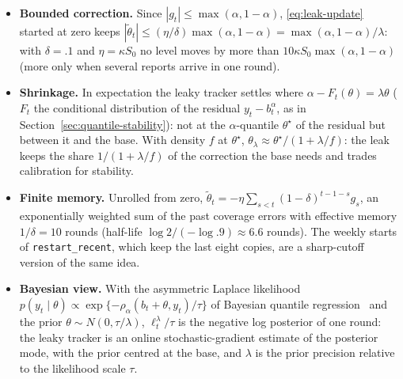 \documentclass[11pt,a4paper]{article}
\theoremstyle{definition}
\theoremstyle{remark}
\begin{document}
\begin{itemize}[leftmargin=*,itemsep=2pt]
\item \textbf{Bounded correction.} Since $|g_t|\le\max(\alpha,1-\alpha)$,
\eqref{eq:leak-update} started at zero keeps
$|\tilde\theta_t|\le(\eta/\delta)\max(\alpha,1-\alpha)
=\max(\alpha,1-\alpha)/\lambda$: with $\delta=.1$ and $\eta=\kappa S_0$ no
level moves by more than $10\kappa S_0\max(\alpha,1-\alpha)$ (more only
when several reports arrive in one round).
\item \textbf{Shrinkage.} In expectation the leaky tracker settles where
$\alpha-F_t(\theta)=\lambda\theta$ ($F_t$ the conditional distribution of
the residual $y_t-b_t^\alpha$, as in Section~\ref{sec:quantile-stability}):
not at the $\alpha$-quantile $\theta^\star$ of the residual but between it
and the base. With density $f$ at $\theta^\star$,
$\theta_\lambda\approx\theta^\star/(1+\lambda/f)$: the leak keeps the share
$1/(1+\lambda/f)$ of the correction the base needs and trades calibration
for stability.
\item \textbf{Finite memory.} Unrolled from zero,
$\tilde\theta_t=-\eta\sum_{s<t}(1-\delta)^{t-1-s}g_s$, an exponentially
weighted sum of the past coverage errors with effective memory
$1/\delta=10$ rounds (half-life $\log2/(-\log.9)\approx6.6$ rounds). The
weekly starts of \texttt{restart\_recent}, which keep the last eight
copies, are a sharp-cutoff version of the same idea.
\item \textbf{Bayesian view.} With the asymmetric Laplace likelihood
$p(y_t\mid\theta)\propto\exp\{-\rho_\alpha(b_t+\theta,y_t)/\tau\}$ of
Bayesian quantile regression~\cite{yu-moyeed} and the prior
$\theta\sim N(0,\tau/\lambda)$, $\ell_t^\lambda/\tau$ is the negative log
posterior of one round: the leaky tracker is an online stochastic-gradient
estimate of the posterior mode, with the prior centred at the base, and
$\lambda$ is the prior precision relative to the likelihood scale $\tau$.
\end{itemize}
\end{document}
